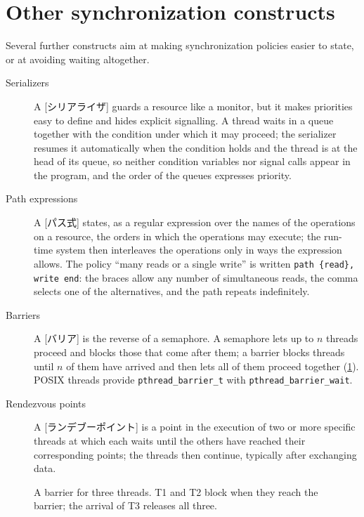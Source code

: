 \documentclass[../main.tex]{subfiles}
\begin{document}
\section{Other synchronization constructs}
\label{sec:l10-other}

Several further constructs aim at making synchronization policies easier to
state, or at avoiding waiting altogether.
\begin{description}
  \item[Serializers] A [シリアライザ] \cite{hewitt1979}
    guards a resource like a monitor, but it makes priorities easy to
    define and hides explicit signalling.  A thread waits in a queue
    together with the condition under which it may proceed; the serializer
    resumes it automatically when the condition holds and the thread is at
    the head of its queue, so neither condition variables nor signal calls
    appear in the program, and the order of the queues expresses priority.
  \item[Path expressions] A [パス式]
    \cite{campbell1974} states, as a regular expression over the names of
    the operations on a resource, the orders in which the operations may
    execute; the run-time system then interleaves the operations only in
    ways the expression allows.  The policy \enquote{many reads or a single
    write} is written \texttt{path \{read\}, write end}: the braces allow
    any number of simultaneous reads, the comma selects one of the
    alternatives, and the path repeats indefinitely.
  \item[Barriers] A [バリア] is the reverse of a semaphore.
    A semaphore lets up to $n$ threads proceed and blocks those that come
    after them; a barrier blocks threads until $n$ of them have arrived and
    then lets all of them proceed together (\cref{fig:l10-barrier}).  POSIX
    threads provide \texttt{pthread\_barrier\_t} with
    \texttt{pthread\_barrier\_wait}.
  \item[Rendezvous points] A [ランデブーポイント] is
    a point in the execution of two or more specific threads at which each
    waits until the others have reached their corresponding points; the
    threads then continue, typically after exchanging data.
\end{description}

\begin{figure}[htbp]
  \centering
  
  \caption{A barrier for three threads.  T1 and T2 block when they reach
    the barrier; the arrival of T3 releases all three.}
  \label{fig:l10-barrier}
\end{figure}
\end{document}
